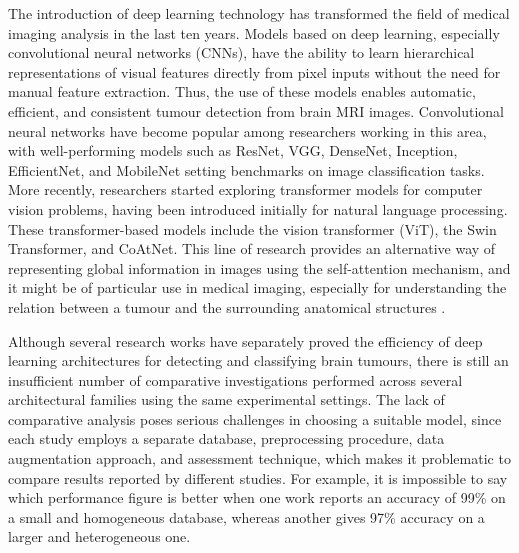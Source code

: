 \documentclass[final,3p,times,number]{elsarticle}
\begin{document}
The introduction of deep learning technology has transformed the field of medical imaging analysis in the last ten years. Models based on deep learning, especially convolutional neural networks (CNNs), have the ability to learn hierarchical representations of visual features directly from pixel inputs without the need for manual feature extraction. Thus, the use of these models enables automatic, efficient, and consistent tumour detection from brain MRI images. Convolutional neural networks have become popular among researchers working in this area, with well-performing models such as ResNet, VGG, DenseNet, Inception, EfficientNet, and MobileNet setting benchmarks on image classification tasks. More recently, researchers started exploring transformer models for computer vision problems, having been introduced initially for natural language processing. These transformer-based models include the vision transformer (ViT), the Swin Transformer, and CoAtNet. This line of research provides an alternative way of representing global information in images using the self-attention mechanism, and it might be of particular use in medical imaging, especially for understanding the relation between a tumour and the surrounding anatomical structures \cite{ref28,ref29,ref30,ref32}.

Although several research works have separately proved the efficiency of deep learning architectures for detecting and classifying brain tumours, there is still an insufficient number of comparative investigations performed across several architectural families using the same experimental settings. The lack of comparative analysis poses serious challenges in choosing a suitable model, since each study employs a separate database, preprocessing procedure, data augmentation approach, and assessment technique, which makes it problematic to compare results reported by different studies. For example, it is impossible to say which performance figure is better when one work reports an accuracy of 99\% on a small and homogeneous database, whereas another gives 97\% accuracy on a larger and heterogeneous one.
\end{document}
